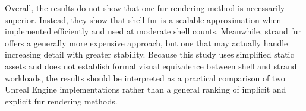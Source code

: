 \documentclass{article}
\begin{document}
Overall, the results do not show that one fur rendering method is necessarily superior. Instead, they show that shell fur is a scalable approximation when implemented efficiently and used at moderate shell counts. Meanwhile, strand fur offers a generally more expensive approach, but one that may actually handle increasing detail with greater stability. Because this study uses simplified static assets and does not establish formal visual equivalence between shell and strand workloads, the results should be interpreted as a practical comparison of two Unreal Engine implementations rather than a general ranking of implicit and explicit fur rendering methods.

\medskip

\printbibliography
\end{document}
